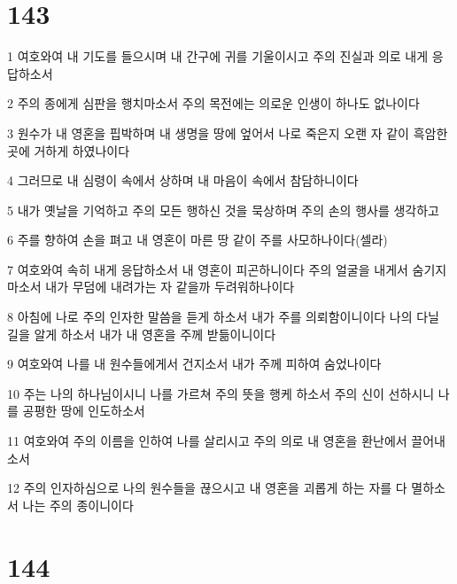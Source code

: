 \chapter{143}

\par 1 여호와여 내 기도를 들으시며 내 간구에 귀를 기울이시고 주의 진실과 의로 내게 응답하소서
\par 2 주의 종에게 심판을 행치마소서 주의 목전에는 의로운 인생이 하나도 없나이다
\par 3 원수가 내 영혼을 핍박하며 내 생명을 땅에 엎어서 나로 죽은지 오랜 자 같이 흑암한 곳에 거하게 하였나이다
\par 4 그러므로 내 심령이 속에서 상하며 내 마음이 속에서 참담하니이다
\par 5 내가 옛날을 기억하고 주의 모든 행하신 것을 묵상하며 주의 손의 행사를 생각하고
\par 6 주를 향하여 손을 펴고 내 영혼이 마른 땅 같이 주를 사모하나이다(셀라)
\par 7 여호와여 속히 내게 응답하소서 내 영혼이 피곤하니이다 주의 얼굴을 내게서 숨기지 마소서 내가 무덤에 내려가는 자 같을까 두려워하나이다
\par 8 아침에 나로 주의 인자한 말씀을 듣게 하소서 내가 주를 의뢰함이니이다 나의 다닐 길을 알게 하소서 내가 내 영혼을 주께 받듦이니이다
\par 9 여호와여 나를 내 원수들에게서 건지소서 내가 주께 피하여 숨었나이다
\par 10 주는 나의 하나님이시니 나를 가르쳐 주의 뜻을 행케 하소서 주의 신이 선하시니 나를 공평한 땅에 인도하소서
\par 11 여호와여 주의 이름을 인하여 나를 살리시고 주의 의로 내 영혼을 환난에서 끌어내소서
\par 12 주의 인자하심으로 나의 원수들을 끊으시고 내 영혼을 괴롭게 하는 자를 다 멸하소서 나는 주의 종이니이다

\chapter{144}

